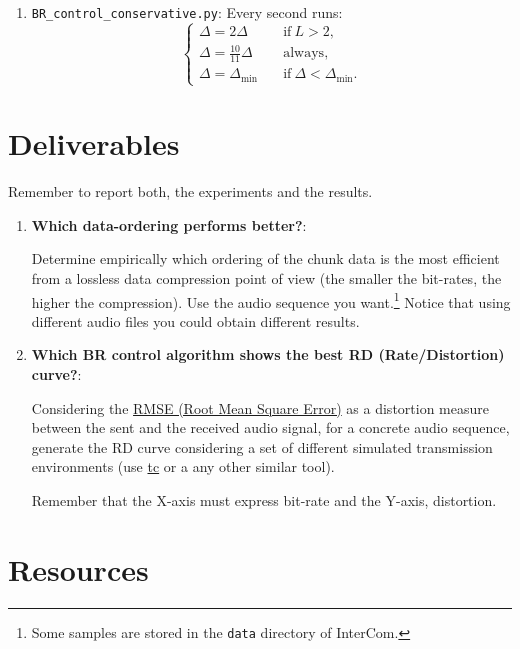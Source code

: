 \begin{enumerate}
\item \verb|BR_control_conservative.py|: Every second runs:
  \begin{equation}
    \left\{
    \begin{array}{ll}
      \Delta = 2\Delta & \quad\text{if}~L>2, \\
      \Delta = \frac{10}{11}\Delta & \quad\text{always}, \\
      \Delta = \Delta_{\text{min}} & \quad\text{if}~\Delta < \Delta_{\text{min}}.
    \end{array}
    \right.
  \end{equation}
\end{enumerate}


\section{Deliverables}

Remember to report both, the experiments and the results.
\begin{enumerate}
\item \textbf{Which data-ordering performs better?}:
  
Determine empirically which ordering of the chunk data is the most
efficient from a lossless data compression point of view (the smaller
the bit-rates, the higher the compression). Use the audio sequence you
want.\footnote{Some samples are stored in the \texttt{data} directory of
  InterCom.} Notice that using different audio files you could obtain
different results.


\item \textbf{Which BR control algorithm shows the best RD (Rate/Distortion) curve?}:
  
Considering the
\href{https://en.wikipedia.org/wiki/Root-mean-square_deviation}{RMSE
  (Root Mean Square Error)} as a distortion measure between the sent
and the received audio signal, for a concrete audio sequence,
generate the RD curve considering a set of different simulated
transmission environments (use
\href{https://vicente-gonzalez-ruiz.github.io/about_tc/}{tc} or a
any other similar tool).

Remember that the X-axis must express bit-rate and the Y-axis, distortion.

\end{enumerate}


\section{Resources}


